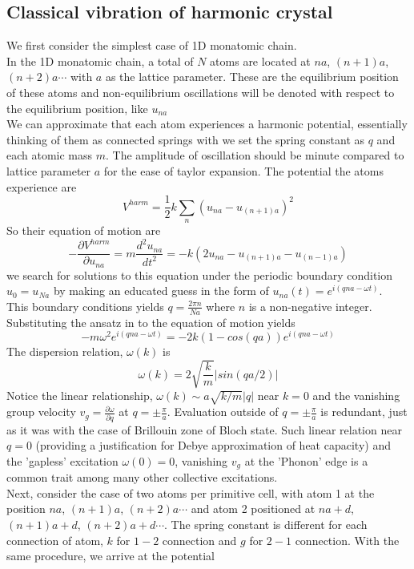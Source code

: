 \documentclass{article}
\begin{document}
\subsection*{Classical vibration of harmonic crystal}
We first consider the simplest case of 1D monatomic chain.\\
In the 1D monatomic chain, a total of $N$  atoms are located at $na$, $(n+1)a$, $(n+2)a\cdots$ with $a$ as the lattice parameter. These are the equilibrium position of these atoms and non-equilibrium oscillations will be denoted with respect to the equilibrium position, like $u_{na}$\\
We can approximate that each atom experiences a harmonic potential, essentially thinking of them as connected springs with we set the spring constant as $q$ and each atomic mass $m$. The amplitude of oscillation should be minute compared to lattice parameter $a$ for the ease of taylor expansion. The potential the atoms experience are
$$V^{harm}=\frac{1}{2}k\sum_n(u_{na}-u_{(n+1)a})^2$$
So their equation of motion are
$$-\frac{\partial V^{harm}}{\partial u_{na}}=m\frac{d^2 u_{na}}{dt^2}=-k(2u_{na}-u_{(n+1)a}-u_{(n-1)a})$$
we search for solutions to this equation under the periodic boundary condition $u_0=u_{Na}$ by making an educated guess in the form of $u_{na}(t)=e^{i(qna-\omega t)}$.\\
This boundary conditions yields $q=\frac{2\pi n}{Na}$ where $n$ is a non-negative integer. Substituting the ansatz in to the equation of motion yields
$$-m\omega^2e^{i(qna-\omega t)}=-2k(1-cos(qa))e^{i(qna-\omega t)}$$
The dispersion relation, $\omega(k)$ is
$$\omega(k)=2\sqrt{\frac{k}{m}}|sin(qa/2)|$$
Notice the linear relationship, $\omega(k)\sim a\sqrt{k/m}|q|$ near $k=0$ and the vanishing group velocity $v_g=\frac{\partial \omega}{\partial q}$ at $q=\pm\frac{\pi}{a}$. Evaluation outside of $q=\pm\frac{\pi}{a}$ is redundant, just as it was with the case of Brillouin zone of Bloch state. Such linear relation near $q=0$ (providing a justification for Debye approximation of heat capacity) and the 'gapless' excitation $\omega(0)=0$, vanishing $v_g$ at the 'Phonon' edge is a common trait among many other collective excitations.\\
Next, consider the case of two atoms per primitive cell, with atom 1 at the position $na$, $(n+1)a$, $(n+2)a\cdots$ and atom 2 positioned at $na+d$, $(n+1)a+d$, $(n+2)a+d\cdots$. The spring constant is different for each connection of atom, $k$ for $1-2$ connection and $g$ for $2-1$ connection. With the same procedure, we arrive at the potential
\end{document}
